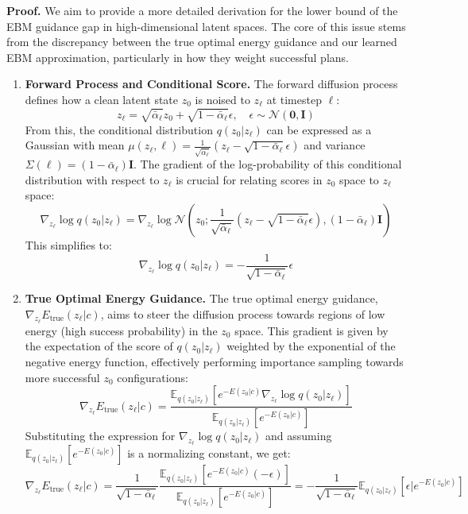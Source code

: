 \documentclass{article} %
\begin{document}
\textbf{Proof.}
We aim to provide a more detailed derivation for the lower bound of the EBM guidance gap in high-dimensional latent spaces. The core of this issue stems from the discrepancy between the true optimal energy guidance and our learned EBM approximation, particularly in how they weight successful plans.
\begin{enumerate}
    \item \textbf{Forward Process and Conditional Score.}
    The forward diffusion process defines how a clean latent state $z_0$ is noised to $z_\ell$ at timestep $\ell$:
    \[
    z_\ell = \sqrt{\bar{\alpha}_\ell} z_0 + \sqrt{1-\bar{\alpha}_\ell} \epsilon, \quad \epsilon \sim \mathcal{N}(\mathbf{0}, \mathbf{I})
    \]
    From this, the conditional distribution $q(z_0|z_\ell)$ can be expressed as a Gaussian with mean $\mu(z_\ell, \ell) = \frac{1}{\sqrt{\bar{\alpha}_\ell}} (z_\ell - \sqrt{1-\bar{\alpha}_\ell} \epsilon)$ and variance $\Sigma(\ell) = (1-\bar{\alpha}_\ell)\mathbf{I}$.
    The gradient of the log-probability of this conditional distribution with respect to $z_\ell$ is crucial for relating scores in $z_0$ space to $z_\ell$ space:
    \[
    \nabla_{z_\ell} \log q(z_0|z_\ell) = \nabla_{z_\ell} \log \mathcal{N}\left(z_0; \frac{1}{\sqrt{\bar{\alpha}_\ell}} (z_\ell - \sqrt{1-\bar{\alpha}_\ell} \epsilon), (1-\bar{\alpha}_\ell)\mathbf{I}\right)
    \]
    This simplifies to:
    \[
    \nabla_{z_\ell} \log q(z_0|z_\ell) = -\frac{1}{\sqrt{1-\bar{\alpha}_\ell}} \epsilon
    \]
    \item \textbf{True Optimal Energy Guidance.}
    The true optimal energy guidance, $\nabla_{z_\ell} E_{\text{true}}(z_\ell|c)$, aims to steer the diffusion process towards regions of low energy (high success probability) in the $z_0$ space. This gradient is given by the expectation of the score of $q(z_0|z_\ell)$ weighted by the exponential of the negative energy function, effectively performing importance sampling towards more successful $z_0$ configurations:
    \[
    \nabla_{z_\ell} E_{\text{true}}(z_\ell|c) = \frac{\mathbb{E}_{q(z_0|z_\ell)}[e^{-E(z_0|c)} \nabla_{z_\ell} \log q(z_0|z_\ell)]}{\mathbb{E}_{q(z_0|z_\ell)}[e^{-E(z_0|c)}]}
    \]
    Substituting the expression for $\nabla_{z_\ell} \log q(z_0|z_\ell)$ and assuming $\mathbb{E}_{q(z_0|z_\ell)}[e^{-E(z_0|c)}]$ is a normalizing constant, we get:
    \[
    \nabla_{z_\ell} E_{\text{true}}(z_\ell|c) = \frac{1}{\sqrt{1-\bar{\alpha}_\ell}} \frac{\mathbb{E}_{q(z_0|z_\ell)}[e^{-E(z_0|c)} (-\epsilon)]}{\mathbb{E}_{q(z_0|z_\ell)}[e^{-E(z_0|c)}]} = -\frac{1}{\sqrt{1-\bar{\alpha}_\ell}} \mathbb{E}_{q(z_0|z_\ell)}[\epsilon | e^{-E(z_0|c)}]
\]
\end{enumerate}
\end{document}

